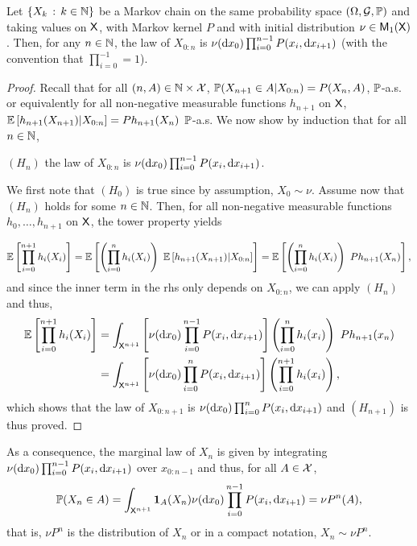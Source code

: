 \documentclass[english,graybox,envcountchap,envcountsame,sectrefs,shortlabels]{svmono}
\theoremstyle{style}
\newenvironment{svmultproof}{\small \begin{proof}}{\end{proof}}
\newcommand{\bfr}{\begin{framed}}
\newcommand{\efr}{\end{framed}}
\begin{document}
\bfr
\begin{lemma}
Let $\left\{ X_{k}\,:\,k\in\mathbb{N}\right\}$ be a Markov chain on the same probability
space $(\Omega,\mathcal{G},\mathbb{P})$ and taking values on $\mathsf{X}$, with Markov
kernel $P$ and with initial distribution $\nu\in\mathsf{M}_{1}(\mathsf{X})$.
Then, for any $n\in\mathbb{N}$, the law of $X_{0:n}$ is $\nu(\mathrm{d} x_{0})\prod_{i=0}^{n-1}P(x_{i},\mathrm{d} x_{i+1})$
(with the convention that $\prod_{i=0}^{-1}=1$).
\end{lemma}
\efr
\begin{svmultproof}
Recall that for all $(n,A)\in\mathbb{N}\times\mathcal{X}$, $\mathbb{P}(X_{n+1}\in A|X_{0:n})=P(X_{n},A)$,
$\mathbb{P}$-a.s. or equivalently for all non-negative measurable functions
$h_{n+1}$ on $\mathsf{X}$, $\mathbb{E}\left[h_{n+1}(X_{n+1})|X_{0:n}\right]=Ph_{n+1}(X_{n})$ $\mathbb{P}$-a.s.
We now show by induction that for all $n\in\mathbb{N}$,
\begin{center}
$(H_{n})$ the law of $X_{0:n}$ is $\nu(\mathrm{d} x_{0})\prod_{i=0}^{n-1}P(x_{i},\mathrm{d} x_{i+1})$.
\par\end{center}
We first note that $(H_{0})$ is true since by assumption, $X_{0}\sim\nu$.
Assume now that $(H_{n})$ holds for some $n\in\mathbb{N}$. Then, for
all non-negative measurable functions $h_{0},\ldots,h_{n+1}$ on $\mathsf{X}$,
the tower property yields

\[
\PE\left[\prod_{i=0}^{n+1}h_{i}(X_{i})\right]=\PE\left[\left(\prod_{i=0}^{n}h_{i}(X_{i})\right)\ \PE\left[h_{n+1}(X_{n+1})|X_{0:n}\right]\right]=\PE\left[\left(\prod_{i=0}^{n}h_{i}(X_{i})\right)\ Ph_{n+1}(X_{n})\right],
\]
 and since the inner term in the rhs only depends on $X_{0:n}$, we
can apply $(H_{n})$ and thus,
\begin{align*}
\PE\left[\prod_{i=0}^{n+1}h_{i}(X_{i})\right] & =\int_{\Xset^{n+1}}\left[\nu(\rmd x_{0})\prod_{i=0}^{n-1}P(x_{i},\rmd x_{i+1})\right]\left(\prod_{i=0}^{n}h_{i}(x_{i})\right)\ Ph_{n+1}(x_{n})\\
 & =\int_{\Xset^{n+1}}\left[\nu(\rmd x_{0})\prod_{i=0}^{n}P(x_{i},\rmd x_{i+1})\right]\left(\prod_{i=0}^{n+1}h_{i}(x_{i})\right),
\end{align*}
which shows that the law of $X_{0:n+1}$ is $\nu(\mathrm{d} x_{0})\prod_{i=0}^{n}P(x_{i},\mathrm{d} x_{i+1})$
and $\left(H_{n+1}\right)$ is thus proved.
\end{svmultproof}
As a consequence, the marginal law of $X_{n}$ is given by integrating
$\nu(\mathrm{d} x_{0})\prod_{i=0}^{n-1}P(x_{i},\mathrm{d} x_{i+1})$ over $x_{0:n-1}$
and thus, for all $A\in\mathcal{X}$,
\[
\mathbb{P}(X_{n}\in A)=\int_{\mathsf{X}^{n+1}}\mathbf{1}_{A}(X_{n})\nu(\mathrm{d} x_{0})\prod_{i=0}^{n-1}P(x_{i},\mathrm{d} x_{i+1})=\nu P^{n}(A),
\]
 that is, $\nu P^{n}$ is the distribution of $X_{n}$ or in a compact
notation, $\boxed{X_{n}\sim\nu P^{n}}$.
\end{document}
